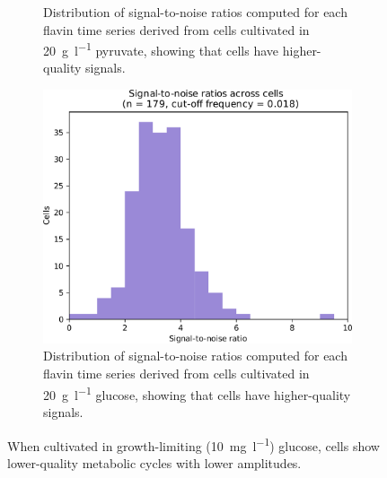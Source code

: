 \begin{figure}
\begin{subfigure}[t]{0.3\textwidth}
   \caption{
    Distribution of signal-to-noise ratios computed for each flavin time series derived from cells cultivated in \SI{20}{\gram~\litre^{-1}} pyruvate, showing that cells have higher-quality signals.
   }
   \label{fig:biology-pyruvate-snr}
  \end{subfigure}%
  \begin{subfigure}[t]{0.3\textwidth}
   \centering
   \includegraphics[width=\textwidth]{glucose_snr_edit.pdf}
   \caption{
    Distribution of signal-to-noise ratios computed for each flavin time series derived from cells cultivated in \SI{20}{\gram~\litre^{-1}} glucose, showing that cells have higher-quality signals.
   }
   \label{fig:biology-highglc-snr}
  \end{subfigure}

  \caption{
    When cultivated in growth-limiting (\SI{10}{\milli\gram~\litre^{-1}}) glucose, cells show lower-quality metabolic cycles with lower amplitudes.
  }
  \label{fig:biology-lowglc}
\end{figure}


